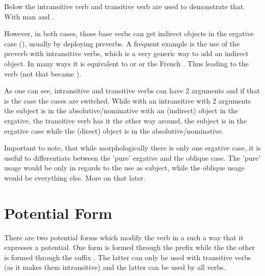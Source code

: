 \documentclass[a4paper, 10pt]{book}
\begin{document}
Below the intransitive verb  and transitive verb  are used to demonstrate that. With  man and .

\begin{exe}
    \ex
    \begin{xlist}
    \item {}
    \item {}
\end{xlist}
\end{exe}

However, in both cases, those base verbs can get indirect objects in the ergative case (), usually by deploying preverbs. A frequent example is the use of the preverb  with intransitive verbs, which is a very generic way to add an indirect object. In many ways it is equivalent to  or  or the French . Thus leading to the verb  (not that  became ).


\begin{exe}
\ex
\begin{xlist}
    \item {}
    \item {}
\end{xlist}
\end{exe}

As one can see, intransitive and transitive verbs can have 2 arguments and if that is the case the cases are switched. While with an intransitive with 2 arguments the subject is in the absolutive/nominative with an (indirect) object in the ergative, the transitive verb has it the other way around, the subject is in the ergative case while the (direct) object is in the absolutive/nominative. 

Important to note, that while morphologically there is only one ergative case, it is useful to differentiate between the 'pure' ergative and the oblique case. The 'pure' usage would be only in regards to the use as subject, while the oblique usage would be everything else. More on that later.

\section{Potential Form}
There are two potential forms which modify the verb in a such a way that it expresses a potential. One form is formed through the prefix  while the the other is formed through the suffix . The latter can only be used with transitive verbs (as it makes them intransitive) and the latter can be used by all verbs.
\end{document}
